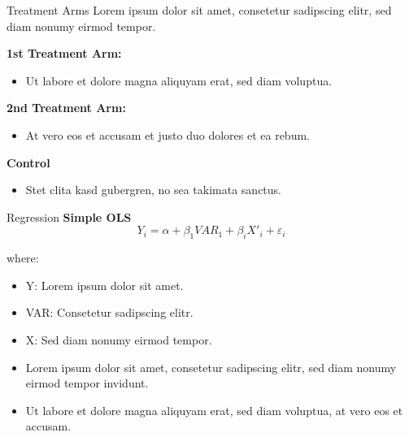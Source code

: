 \documentclass[aspectratio=169]{beamer}
\begin{document}
\begin{frame}{Treatment Arms}
Lorem ipsum dolor sit amet, consetetur sadipscing elitr, sed diam nonumy eirmod tempor.
\begin{block}{\textbf{1st Treatment Arm:}}
\begin{itemize}
\item[$\rightarrow$] Ut labore et dolore magna aliquyam erat, sed diam voluptua.
\end{itemize}
\end{block}
\begin{block}{\textbf{2nd Treatment Arm:}}
\begin{itemize}
\item[$\rightarrow$] At vero eos et accusam et justo duo dolores et ea rebum.
\end{itemize}
\end{block}
\begin{block}{\textbf{Control}}
\begin{itemize}
\item[$\rightarrow$] Stet clita kasd gubergren, no sea takimata sanctus.
\end{itemize}
\end{block}
\end{frame}

\begin{frame}{Regression}
\textbf{Simple OLS}
\begin{equation*}
Y_i = \alpha + \beta_1 VAR_1 + \beta_i X'_{i} + \varepsilon_i
\end{equation*}

\begin{small}
where:
\begin{itemize}[noitemsep]
\item[$-$] Y: Lorem ipsum dolor sit amet.
\item[$-$] VAR: Consetetur sadipscing elitr.
\item[$-$] X: Sed diam nonumy eirmod tempor.
\end{itemize}
\end{small}

\vspace{10pt}
\begin{itemize}
\item[$\rightarrow$] Lorem ipsum dolor sit amet, consetetur sadipscing elitr, sed diam nonumy eirmod tempor invidunt.
\item[$\rightarrow$] Ut labore et dolore magna aliquyam erat, sed diam voluptua, at vero eos et accusam.
\end{itemize}
\end{frame}
\end{document}
